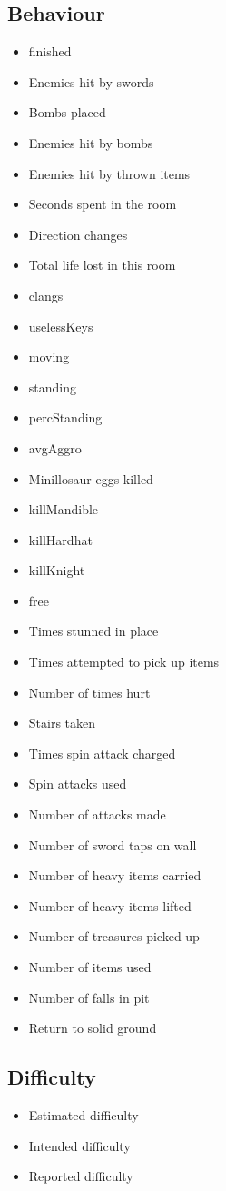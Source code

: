 \documentclass[a4paper]{article}
\begin{document}
\begin{multicols}{2}
\subsection{Behaviour}
\begin{itemize}
\item finished
\item Enemies hit by swords
\item Bombs placed
\item Enemies hit by bombs
\item Enemies hit by thrown items
\item Seconds spent in the room
\item Direction changes
\item Total life lost in this room
\item clangs
\item uselessKeys
\item moving
\item standing
\item percStanding
\item avgAggro
\item Minillosaur eggs killed
\item killMandible
\item killHardhat
\item killKnight
\item free
\item Times stunned in place
\item Times attempted to pick up items
\item Number of times hurt
\item Stairs taken
\item Times spin attack charged
\item Spin attacks used
\item Number of attacks made
\item Number of sword taps on wall
\item Number of heavy items carried
\item Number of heavy items lifted
\item Number of treasures picked up
\item Number of items used
\item Number of falls in pit
\item Return to solid ground
\end{itemize}
\subsection{Difficulty}
\begin{itemize}
\item Estimated difficulty
\item Intended difficulty
\item Reported difficulty
\end{itemize}

\end{multicols}
\end{document}
